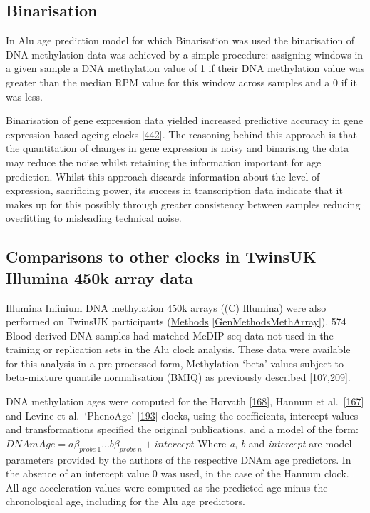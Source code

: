 \documentclass[
]{book}
\begin{document}
\hypertarget{binarisation}{%
\subsection{Binarisation}\label{binarisation}}

In Alu age prediction model for which Binarisation was used the binarisation of DNA methylation data was achieved by a simple procedure: assigning windows in a given sample a DNA methylation value of 1 if their DNA methylation value was greater than the median RPM value for this window across samples and a 0 if it was less.

Binarisation of gene expression data yielded increased predictive accuracy in gene expression based ageing clocks {[}\protect\hyperlink{ref-Meyer2020}{442}{]}.
The reasoning behind this approach is that the quantitation of changes in gene expression is noisy and binarising the data may reduce the noise whilst retaining the information important for age prediction.
Whilst this approach discards information about the level of expression, sacrificing power, its success in transcription data indicate that it makes up for this possibly through greater consistency between samples reducing overfitting to misleading technical noise.

\hypertarget{AluMethodsArrays}{%
\subsection{Comparisons to other clocks in TwinsUK Illumina 450k array data}\label{AluMethodsArrays}}

Illumina Infinium DNA methylation 450k arrays ((C) Illumina) were also performed on TwinsUK participants (\protect\hyperlink{GenMethodsMethArray}{Methods} \ref{GenMethodsMethArray}).
574 Blood-derived DNA samples had matched MeDIP-seq data not used in the training or replication sets in the Alu clock analysis.
These data were available for this analysis in a pre-processed form, Methylation `beta' values subject to beta-mixture quantile normalisation (BMIQ) as previously described {[}\protect\hyperlink{ref-Bell2017a}{107},\protect\hyperlink{ref-Bell2016}{209}{]}.

DNA methylation ages were computed for the Horvath {[}\protect\hyperlink{ref-Horvath2013}{168}{]}, Hannum et al.~{[}\protect\hyperlink{ref-Hannum2013}{167}{]} and Levine et al.~`PhenoAge' {[}\protect\hyperlink{ref-Levine2018}{193}{]} clocks, using the coefficients, intercept values and transformations specified the original publications, and a model of the form:
\(DNAmAge = a\beta_{probe\ 1} ... b\beta_{probe\ n} + intercept\)
Where \emph{a}, \emph{b} and \emph{intercept} are model parameters provided by the authors of the respective DNAm age predictors.
In the absence of an intercept value 0 was used, in the case of the Hannum clock.
All age acceleration values were computed as the predicted age minus the chronological age, including for the Alu age predictors.
\end{document}
